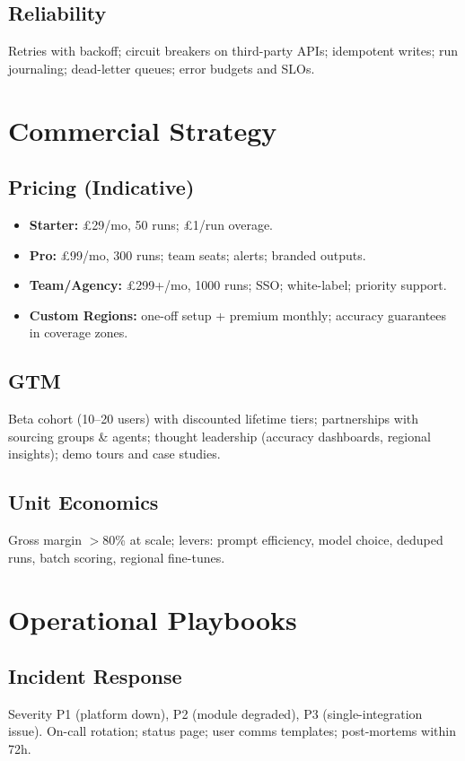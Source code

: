 \documentclass[12pt,a4paper]{article}
\begin{document}
\subsection{Reliability}
Retries with backoff; circuit breakers on third-party APIs; idempotent writes; run journaling; dead-letter queues; error budgets and SLOs.

\section{Commercial Strategy}
\subsection{Pricing (Indicative)}
\begin{itemize}[leftmargin=1.5em]
  \item \textbf{Starter:} \pounds29/mo, 50 runs; \pounds1/run overage.
  \item \textbf{Pro:} \pounds99/mo, 300 runs; team seats; alerts; branded outputs.
  \item \textbf{Team/Agency:} \pounds299+/mo, 1000 runs; SSO; white-label; priority support.
  \item \textbf{Custom Regions:} one-off setup + premium monthly; accuracy guarantees in coverage zones.
\end{itemize}

\subsection{GTM}
Beta cohort (10--20 users) with discounted lifetime tiers; partnerships with sourcing groups \& agents; thought leadership (accuracy dashboards, regional insights); demo tours and case studies.

\subsection{Unit Economics}
Gross margin $>$80\% at scale; levers: prompt efficiency, model choice, deduped runs, batch scoring, regional fine-tunes.

\section{Operational Playbooks}
\subsection{Incident Response}
Severity P1 (platform down), P2 (module degraded), P3 (single-integration issue). On-call rotation; status page; user comms templates; post-mortems within 72h.
\end{document}
